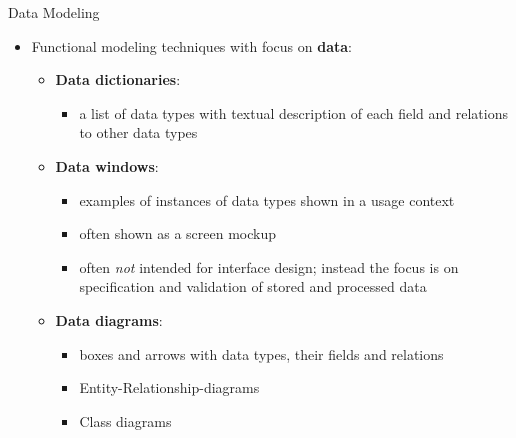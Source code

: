 \begin{Slide}{Data Modeling }
\begin{itemize}
\item Functional modeling techniques with focus on \textbf{data}:
\begin{itemize}
\item \textbf{Data dictionaries}: 
\begin{itemize}
\item a list of data types with textual description of each field and relations to other data types
\end{itemize}
\item \textbf{Data windows}: 
\begin{itemize}
\item examples of instances of data types shown in a usage context
\item often shown as a screen mockup
\item often \textit{not} intended for interface design; instead the focus is on specification and validation of stored and processed data 
\end{itemize}
\item \textbf{Data diagrams}: 
\begin{itemize}
\item boxes and arrows with data types, their fields and relations  
\item Entity-Relationship-diagrams
\item Class diagrams

\end{itemize}
\end{itemize}
\end{itemize}
\end{Slide}